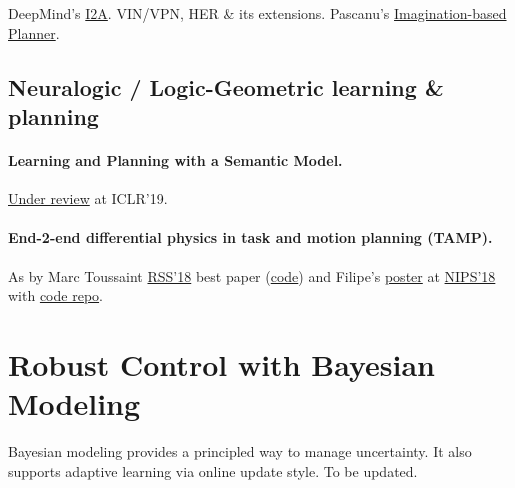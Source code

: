 \documentclass[12pt]{article}
\numberwithin{equation}{section}
\begin{document}
DeepMind's \href{ https://deepmind.com/blog/agents-imagine-and-plan/}{I2A}. VIN/VPN, HER \& its extensions. Pascanu's \href{https://www.semanticscholar.org/paper/Learning-model-based-planning-from-scratch-Pascanu-Li/bd1d59433e3b7ae7207c24b4cd1838acea91425c}{Imagination-based Planner}.

\subsection{Neuralogic / Logic-Geometric learning \& planning}

\paragraph{Learning and Planning with a Semantic Model.} \href{https://openreview.net/forum?id=SJgs1n05YQ}{Under review} at ICLR'19.

\paragraph{End-2-end differential physics in task and motion planning (TAMP).} As by Marc Toussaint \href{http://www.roboticsproceedings.org/rss14/p44.pdf}{RSS'18} best paper (\href{https://github.com/MarcToussaint/18-RSS-PhysicalManipulation}{code}) and Filipe's \href{https://filipeabperes.github.io/files/2018/nips_poster.pdf}{poster} at \href{https://papers.nips.cc/paper/7948-end-to-end-differentiable-physics-for-learning-and-control}{NIPS'18} with \href{https://github.com/locuslab/lcp-physics}{code repo}.

\section{Robust Control with Bayesian Modeling}

Bayesian modeling provides a principled way to manage uncertainty. It also supports adaptive learning via online update style. To be updated.
\end{document}
